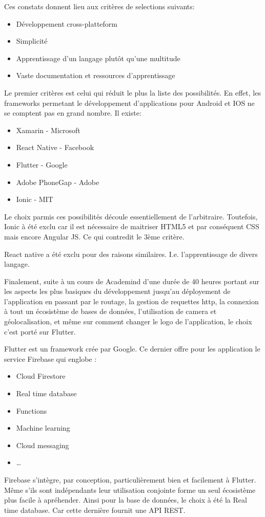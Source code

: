     Ces constats donnent lieu aux critères de selections suivants:
    \smallskip
    \begin{itemize}
        \item Développement cross-platteform
        \item Simplicité
        \item Apprentissage d'un langage plutôt qu'une multitude
        \item Vaste documentation et ressources d'apprentissage
    \end{itemize}
    \smallskip
    Le premier critères est celui qui réduit le plus la liste des possibilités. En effet, les frameworks 
    permetant le développement d'applications pour Android et IOS ne se comptent pas en grand nombre. Il existe:
    \smallskip
    \begin{itemize}
        \item Xamarin - Microsoft
        \item React Native - Facebook
        \item Flutter - Google
        \item Adobe PhoneGap - Adobe
        \item Ionic - MIT
    \end{itemize}
    \smallskip
    Le choix parmis ces possibilités découle essentiellement de l'arbitraire. Toutefois, Ionic à été exclu
    car il est nécessaire de maitriser HTML5 et par conséquent CSS mais encore Angular JS. Ce qui contredit le 3ème critère.

    React native a été exclu pour des raisons similaires. I.e. l'apprentissage de divers langage.

    Finalement, suite à un cours de Academind d'une durée de 40 heures portant sur les aspects les
    plus basiques du développement jusqu'au déployement de l'application en passant par le routage, la gestion de requettes http,
    la connexion à tout un écosistème de bases de données, l'utilisation de camera et géolocalisation, et même sur 
    comment changer le logo de l'application, le choix c'est porté sur Flutter.

    Flutter est un framework crée par Google. Ce dernier offre pour les application le service Firebase qui englobe :
    \smallskip
    \begin{itemize}
        \item Cloud Firestore
        \item Real time database
        \item Functions
        \item Machine learning
        \item Cloud messaging
        \item \dots
    \end{itemize}
    \smallskip
    Firebase s'intègre, par conception, particulièrement bien et facilement à Flutter. Même s'ils sont
    indépendants leur utilisation conjointe forme un seul écosistème plus facile à apréhender. Ainsi pour la 
    base de données, le choix à été la Real time database. Car cette dernière fournit une API REST.

